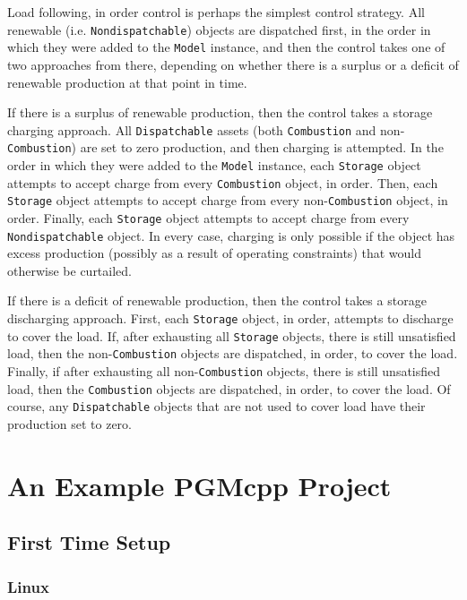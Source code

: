 \documentclass[12pt, letterpaper]{report}
\begin{document}
Load following, in order control is perhaps the simplest control strategy. All renewable (i.e. \texttt{Nondispatchable}) objects are dispatched first, in the order in which they were added to the \texttt{Model} instance, and then the control takes one of two approaches from there, depending on whether there is a surplus or a deficit of renewable production at that point in time. \par 
If there is a surplus of renewable production, then the control takes a storage charging approach. All \texttt{Dispatchable} assets (both \texttt{Combustion} and non-\texttt{Combustion}) are set to zero production, and then charging is attempted. In the order in which they were added to the \texttt{Model} instance, each \texttt{Storage} object attempts to accept charge from every \texttt{Combustion} object, in order. Then, each \texttt{Storage} object attempts to accept charge from every non-\texttt{Combustion} object, in order. Finally, each \texttt{Storage} object attempts to accept charge from every \texttt{Nondispatchable} object. In every case, charging is only possible if the object has excess production (possibly as a result of operating constraints) that would otherwise be curtailed. \par 
If there is a deficit of renewable production, then the control takes a storage discharging approach. First, each \texttt{Storage} object, in order, attempts to discharge to cover the load. If, after exhausting all \texttt{Storage} objects, there is still unsatisfied load, then the non-\texttt{Combustion} objects are dispatched, in order, to cover the load. Finally, if after exhausting all non-\texttt{Combustion} objects, there is still unsatisfied load, then the \texttt{Combustion} objects are dispatched, in order, to cover the load. Of course, any \texttt{Dispatchable} objects that are not used to cover load have their production set to zero.

\chapter{An Example PGMcpp Project}

\section{First Time Setup}

\subsection{Linux}
\end{document}
